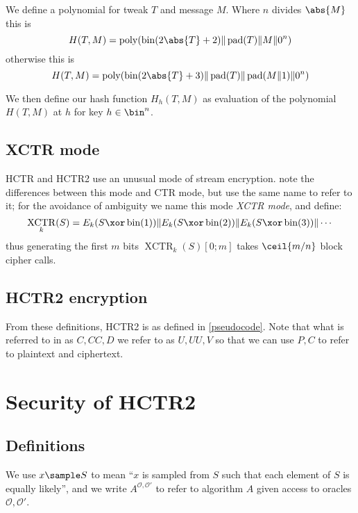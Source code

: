 \documentclass[letterpaper,11pt]{article}
\newcommand*{\Concat}{\Vert}
\newcommand*{\UU}{\mathit{UU}}
\DeclareMathOperator{\fromint}{bin}
\DeclareMathOperator{\pad}{pad}
\DeclareMathOperator{\poly}{poly}
\DeclareMathOperator{\XCTR}{XCTR}
\begin{document}
We define a polynomial for tweak \(T\) and message \(M\). Where \(n\) divides
\(\abs{M}\) this is
\begin{displaymath}
    H(T, M) = \poly(\fromint(2\abs{T} + 2) \Concat \pad(T) \Concat M \Concat 0^n)
\end{displaymath}
otherwise this is
\begin{displaymath}
    H(T, M) = \poly(\fromint(2\abs{T} + 3) \Concat \pad(T) \Concat \pad(M \Concat 1) \Concat 0^n)
\end{displaymath}

We then define our hash function \(H_h(T, M)\) as evaluation
of the polynomial \(H(T, M)\) at \(h\) for key \(h \in \bin^n\).

\subsection{XCTR mode}

HCTR and HCTR2 use an unusual mode of stream encryption.
\cite{hctr,hctrquad} note the differences between this mode and CTR mode,
but use the same name to refer to it; for the avoidance of ambiguity
we name this mode \emph{XCTR mode}, and define:
\begin{displaymath}
    \XCTR_k(S) = E_k(S \xor \fromint(1)) \Concat E_k(S \xor \fromint(2)) \Concat E_k(S \xor \fromint(3)) \Concat \cdots
\end{displaymath}
thus generating the first \(m\) bits \(\XCTR_k(S)[0; m]\) takes \(\ceil{m/n}\) block cipher calls.

\subsection{HCTR2 encryption}

From these definitions, HCTR2 is as defined in \autoref{pseudocode}.
Note that what is referred to in \cite{hctr,hctrquad} as \(C, \mathit{CC}, D\)
we refer to as \(U, \UU, V\)
so that we can use \(P, C\) to refer to plaintext and ciphertext.

\section{Security of HCTR2}
\subsection{Definitions}
We use \(x \sample S\) to mean ``\(x\) is sampled from \(S\) such that
each element of \(S\) is equally likely'', and we write
\(A^{\mathcal{O}, \mathcal{O}'}\) to refer to algorithm \(A\)
given access to oracles \(\mathcal{O}, \mathcal{O}'\).
\end{document}
